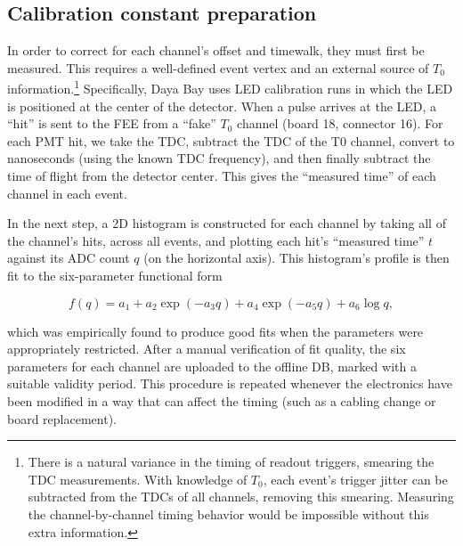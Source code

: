 \documentclass[../thesis.tex]{subfiles}
\begin{document}
\subsection{Calibration constant preparation}

In order to correct for each channel's offset and timewalk, they must first be measured. This requires a well-defined event vertex and an external source of $T_0$ information.\footnote{There is a natural variance in the timing of readout triggers, smearing the TDC measurements. With knowledge of $T_0$, each event's trigger jitter can be subtracted from the TDCs of all channels, removing this smearing. Measuring the channel-by-channel timing behavior would be impossible without this extra information.} Specifically, Daya Bay uses LED calibration runs in which the LED is positioned at the center of the detector. When a pulse arrives at the LED, a ``hit'' is sent to the FEE from a ``fake'' $T_0$ channel (board 18, connector 16). For each PMT hit, we take the TDC, subtract the TDC of the T0 channel, convert to nanoseconds (using the known TDC frequency), and then finally subtract the time of flight from the detector center. This gives the ``measured time'' of each channel in each event.

In the next step, a 2D histogram is constructed for each channel by taking all of the channel's hits, across all events, and plotting each hit's ``measured time'' $t$ against its ADC count $q$ (on the horizontal axis). This histogram's profile is then fit to the six-parameter functional form

\[ f(q) = a_1 + a_2 \exp (-a_3 q) + a_4 \exp (-a_5 q) + a_6 \log q, \] 

\noindent which was empirically found to produce good fits when the parameters were appropriately restricted. After a manual verification of fit quality, the six parameters for each channel are uploaded to the offline DB, marked with a suitable validity period. This procedure is repeated whenever the electronics have been modified in a way that can affect the timing (such as a cabling change or board replacement).

\begin{comment}
Show the tof-corrected times; comment on TDC discretization. Also, what about
the global offset adjustment? (It's in the DB filler script?) And the fact that
TDC values must be negated.
\end{comment}
\end{document}
